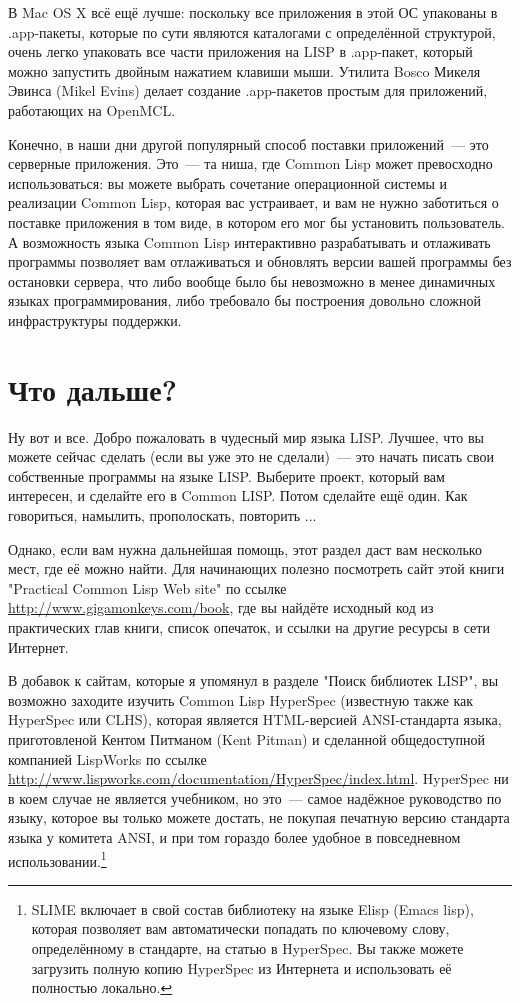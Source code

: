 В Mac OS X всё ещё лучше: поскольку все приложения в этой ОС упакованы в .app-пакеты,
которые по сути являются каталогами с определённой структурой, очень легко упаковать все
части приложения на LISP в .app-пакет, который можно запустить двойным нажатием клавиши
мыши. Утилита Bosco Микеля Эвинса (Mikel Evins) делает создание .app-пакетов простым для
приложений, работающих на OpenMCL.

Конечно, в наши дни другой популярный способ поставки приложений~--- это серверные
приложения. Это~--- та ниша, где Common Lisp может превосходно использоваться: вы можете
выбрать сочетание операционной системы и реализации Common Lisp, которая вас устраивает, и
вам не нужно заботиться о поставке приложения в том виде, в котором его мог бы установить
пользователь. А возможность языка Common Lisp интерактивно разрабатывать и отлаживать
программы позволяет вам отлаживаться и обновлять версии вашей программы без остановки
сервера, что либо вообще было бы невозможно в менее динамичных языках программирования,
либо требовало бы построения довольно сложной инфраструктуры поддержки.

\section{Что дальше?}

Ну вот и все. Добро пожаловать в чудесный мир языка LISP. Лучшее, что вы можете сейчас
сделать (если вы уже это не сделали)~--- это начать писать свои собственные программы на
языке LISP. Выберите проект, который вам интересен, и сделайте его в Common LISP. Потом
сделайте ещё один. Как говориться, намылить, прополоскать, повторить ...

Однако, если вам нужна дальнейшая помощь, этот раздел даст вам несколько мест, где её
можно найти. Для начинающих полезно посмотреть сайт этой книги "Practical Common Lisp Web
site" по ссылке \url{http://www.gigamonkeys.com/book}, где вы найдёте исходный код из
практических глав книги, список опечаток, и ссылки на другие ресурсы в сети Интернет.

В добавок к сайтам, которые я упомянул в разделе "Поиск библиотек LISP", вы возможно
заходите изучить Common Lisp HyperSpec (известную также как HyperSpec или CLHS), которая
является HTML-версией ANSI-стандарта языка, приготовленой Кентом Питманом (Kent Pitman) и
сделанной общедоступной компанией LispWorks по ссылке
\url{http://www.lispworks.com/documentation/HyperSpec/index.html}. HyperSpec ни в коем
случае не является учебником, но это~--- самое надёжное руководство по языку, которое вы
только можете достать, не покупая печатную версию стандарта языка у комитета ANSI, и при
том гораздо более удобное в повседневном использовании.\footnote{SLIME включает в свой
  состав библиотеку на языке Elisp (Emacs lisp), которая позволяет вам автоматически
  попадать по ключевому слову, определённому в стандарте, на статью в HyperSpec. Вы также
  можете загрузить полную копию HyperSpec из Интернета и использовать её полностью
  локально.}

